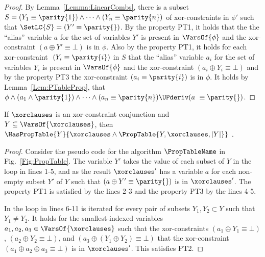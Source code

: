 \begin{proof}
By Lemma~\ref{Lemma:LinearCombs}, there is a subset $S = (Y_1 \equiv \parity{1}) \wedge \dots \wedge (Y_n \equiv \parity{n}) $ of xor-constraints in $\phi'$ such that $ \SetLC{S} = (Y' \equiv \parity{}) $.
By the property PT1, it holds that the the ``alias'' variable $a$ for the set of variables $Y'$ is present in $ \VarsOf{\phi} $ and the xor-constraint $ (a \oplus Y' \equiv \bot) $ is in $\phi$.
Also by the property PT1, it holds for each xor-constraint $ (Y_i \equiv
\parity{i}) $ in $S$ that the ``alias'' variable $ a_i $ for the set of
variables $Y_i$ is present in $\VarsOf{\phi}$ and the xor-constraint
$ (a_i \oplus Y_i \equiv
\bot) $ and by the property PT3 the xor-constraint $ (a_i \equiv
    \parity{i}) $ is in $ \phi$.
It holds by Lemma~\ref{Lem:PTableProp}, that $ \phi \wedge (a_1 \wedge
\parity{1}) \wedge \dots \wedge (a_n \equiv \parity{n}) \UPderiv
(a \equiv \parity{}) $.
\end{proof}


\begin{lemma}
\label{Lem:PropTableImpl}
If $ \xorclauses$ is an xor-constraint conjunction and $ Y \subseteq
\VarsOf{\xorclauses}$, then $ \HasPropTable{Y}{\xorclauses \wedge \PropTable{Y,
    \xorclauses, |Y|}}$ .
\end{lemma}

\begin{proof}
Consider the pseudo code for the algorithm $\PropTableName$ in Fig.~\ref{Fig:PropTable}.
The variable $ Y' $ takes the value of each subset of $ Y $ in the loop in 
lines 1-5, and as the result $ \xorclauses'$ has a variable $a$ for each non-empty
subset $Y'$ of $ Y $ such that $ (a \oplus Y' \equiv \parity{}) $ is in $ \xorclauses'$. The property PT1 is satisfied by the lines 2-3 and the property PT3 by the lines 4-5.

In the loop in lines 6-11 is iterated for every pair of subsets $ Y_1, Y_2
\subset Y $ such that $ Y_1 \not = Y_2$. It holds for the smallest-indexed
variables $a_1,a_2,a_3 \in \VarsOf{\xorclauses}$ such that 
 the xor-constraints $ (a_1 \oplus Y_1 \equiv  \bot) $,
$ (a_2 \oplus Y_2 \equiv \bot)$, and $ (a_3 \oplus (Y_1 \oplus Y_2) \equiv
    \bot)$ that the xor-constraint $ (a_1 \oplus a_2 \oplus a_3 \equiv \bot)$
is in $ \xorclauses' $. This satisfies PT2.
\end{proof}

